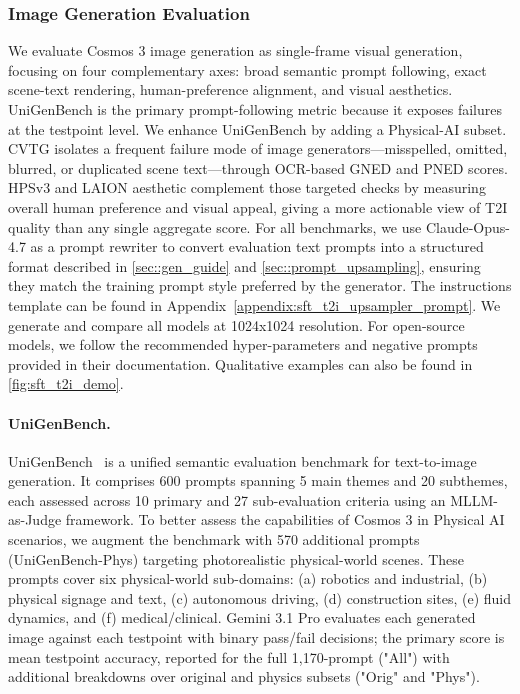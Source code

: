 \subsubsection{Image Generation Evaluation}
\label{subsec::image_eval}

\par \noindent
We evaluate Cosmos 3 image generation as single-frame visual generation, focusing on four complementary axes: broad semantic prompt following, exact scene-text rendering, human-preference alignment, and visual aesthetics.
UniGenBench is the primary prompt-following metric because it exposes failures at the testpoint level. We enhance UniGenBench by adding a Physical-AI subset.
CVTG isolates a frequent failure mode of image generators---misspelled, omitted, blurred, or duplicated scene text---through OCR-based GNED and PNED scores.
HPSv3 and LAION aesthetic complement those targeted checks by measuring overall human preference and visual appeal, giving a more actionable view of T2I quality than any single aggregate score.
For all benchmarks, we use Claude-Opus-4.7 as a prompt rewriter to convert evaluation text prompts into a structured format described in \cref{sec::gen_guide} and \cref{sec::prompt_upsampling}, ensuring they match the training prompt style preferred by the generator. The instructions template can be found in Appendix~\ref{appendix:sft_t2i_upsampler_prompt}. We generate and compare all models at 1024x1024 resolution. For open-source models, we follow the recommended hyper-parameters and negative prompts provided in their documentation. Qualitative examples can also be found in \cref{fig:sft_t2i_demo}.



\paragraph{UniGenBench.} UniGenBench~\citep{wang2025unigenbench} is a unified semantic evaluation benchmark for text-to-image generation.
It comprises 600 prompts spanning 5 main themes and 20 subthemes, each assessed across 10 primary and 27 sub-evaluation criteria using an MLLM-as-Judge framework.
To better assess the capabilities of Cosmos 3 in Physical AI scenarios, we augment the benchmark with 570 additional prompts (UniGenBench-Phys) targeting photorealistic physical-world scenes.
These prompts cover six physical-world sub-domains: (a) robotics and industrial, (b) physical signage and text, (c) autonomous driving, (d) construction sites, (e) fluid dynamics, and (f) medical/clinical.
Gemini 3.1 Pro evaluates each generated image against each testpoint with binary pass/fail decisions; the primary score is mean testpoint accuracy, reported for the full 1{,}170-prompt (\ie "All") with additional breakdowns over original and physics subsets (\ie "Orig" and "Phys").

